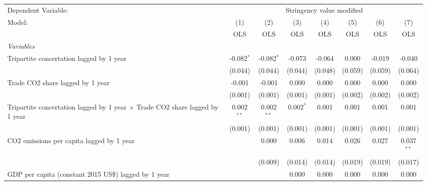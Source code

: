 
\begingroup
\centering
\begin{tabular}{lccccccc}
   \toprule
   Dependent Variable: & \multicolumn{7}{c}{Stringency value modified}\\
   Model:                                                                              & (1)          & (2)          & (3)         & (4)     & (5)          & (6)          & (7)\\  
                                                                                       &  OLS         & OLS          & OLS         & OLS     & OLS          & OLS          & OLS\\  
   \midrule
   \emph{Variables}\\
   Tripartite concertation lagged by 1 year                                            & -0.082$^{*}$ & -0.082$^{*}$ & -0.073      & -0.064  & 0.000        & -0.019       & -0.040\\   
                                                                                       & (0.044)      & (0.044)      & (0.044)     & (0.048) & (0.059)      & (0.059)      & (0.064)\\   
   Trade CO2 share lagged by 1 year                                                    & -0.001       & -0.001       & 0.000       & 0.000   & 0.000        & 0.000        & 0.000\\   
                                                                                       & (0.001)      & (0.001)      & (0.001)     & (0.001) & (0.002)      & (0.002)      & (0.002)\\   
   Tripartite concertation lagged by 1 year $\times$ Trade CO2 share lagged by 1 year  & 0.002$^{**}$ & 0.002$^{**}$ & 0.002$^{*}$ & 0.001   & 0.001        & 0.001        & 0.001\\   
                                                                                       & (0.001)      & (0.001)      & (0.001)     & (0.001) & (0.001)      & (0.001)      & (0.001)\\   
   CO2 emissions per capita lagged by 1 year                                           &              & 0.000        & 0.006       & 0.014   & 0.026        & 0.027        & 0.037$^{**}$\\   
                                                                                       &              & (0.009)      & (0.014)     & (0.014) & (0.019)      & (0.019)      & (0.017)\\   
   GDP per capita (constant 2015 US\$) lagged by 1 year                                &              &              & 0.000       & 0.000   & 0.000        & 0.000        & 0.000\\   

\end{tabular}
